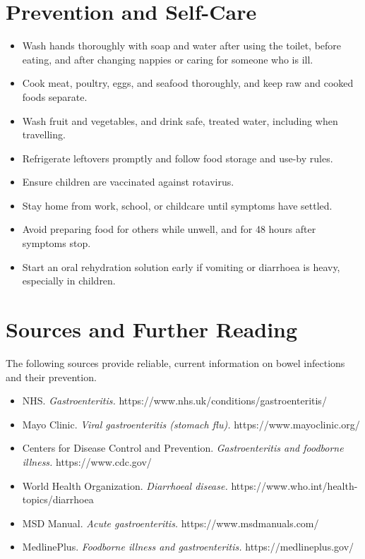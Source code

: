 \section*{Prevention and Self-Care}
\begin{itemize}
    \item Wash hands thoroughly with soap and water after using the toilet, before eating, and after changing nappies or caring for someone who is ill.
    \item Cook meat, poultry, eggs, and seafood thoroughly, and keep raw and cooked foods separate.
    \item Wash fruit and vegetables, and drink safe, treated water, including when travelling.
    \item Refrigerate leftovers promptly and follow food storage and use-by rules.
    \item Ensure children are vaccinated against rotavirus.
    \item Stay home from work, school, or childcare until symptoms have settled.
    \item Avoid preparing food for others while unwell, and for 48 hours after symptoms stop.
    \item Start an oral rehydration solution early if vomiting or diarrhoea is heavy, especially in children.
\end{itemize}

\section*{Sources and Further Reading}
The following sources provide reliable, current information on bowel infections and their prevention.
\begin{itemize}
    \item NHS. \textit{Gastroenteritis.} https://www.nhs.uk/conditions/gastroenteritis/
    \item Mayo Clinic. \textit{Viral gastroenteritis (stomach flu).} https://www.mayoclinic.org/
    \item Centers for Disease Control and Prevention. \textit{Gastroenteritis and foodborne illness.} https://www.cdc.gov/
    \item World Health Organization. \textit{Diarrhoeal disease.} https://www.who.int/health-topics/diarrhoea
    \item MSD Manual. \textit{Acute gastroenteritis.} https://www.msdmanuals.com/
    \item MedlinePlus. \textit{Foodborne illness and gastroenteritis.} https://medlineplus.gov/
\end{itemize}

